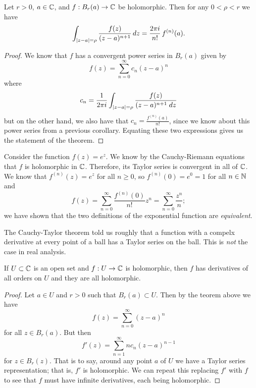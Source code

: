 
\begin{theorem}
    Let $r > 0$, $a \in \mathbb{C}$, and $f: B_r(a) \to \mathbb{C}$ be holomorphic.
    Then for any $0 < \rho < r$ we have
    \[
        \int_{\left\lvert z-a\right\rvert=\rho} \frac{f(z)}{(z-a)^{n+1}} \,dz
        = \frac{2\pi i}{n!} \, f^{(n)}(a).
    \]
\end{theorem}

\begin{proof}
    We know that $f$ has a convergent power series in $B_r(a)$ given by
    \[
        f(z) = \sum^{\infty}_{n=0} c_n(z-a)^n
    \]
    where
    \[
        c_n = \frac{1}{2\pi i} \int_{\left\lvert z-a\right\rvert=\rho} \frac{f(z)}{(z-a)^{n+1} \;dz} 
    \]
    but on the other hand, we also have that $c_n = \frac{f^{(n)}(a)}{n!}$,
    since we know about this power series from a previous corollary.
    Equating these two expressions gives us the statement of the theorem.
\end{proof}

\begin{example}
    Consider the function $f(z) = e^z$.
    We know by the Cauchy-Riemann equations that $f$ is holomorphic in $\mathbb{C}$.
    Therefore, its Taylor series is convergent in all of $\mathbb{C}$.
    We know that $f^{(n)}(z) = e^z$ for all $n \geq 0$,
    so $f^{(n)}(0) = e^0 = 1$ for all $n \in \mathbb{N}$ and
    \[
        f(z) = \sum^{\infty}_{n=0} \frac{f^{(n)}(0)}{n!} z^n = \sum^{\infty}_{n=0} \frac{z^n}{n};
    \]
    we have shown that the two definitions of the exponential function
    are \emph{equivalent}.
\end{example}

\begin{remark}
    The Cauchy-Taylor theorem told us roughly that a function with a compelx derivative at
    every point of a ball has a Taylor series on the ball.
    This is \emph{not} the case in real analysis.
\end{remark}

\begin{corollary}
    If $U \subset \mathbb{C}$ is an open set and $f: U \to \mathbb{C}$ is holomorphic,
    then $f$ has derivatives of all orders on $U$ and they are all holomorphic.
\end{corollary}

\begin{proof}
    Let $a \in U$ and $r > 0$ such that $B_r(a) \subset U$.
    Then by the teorem above we have
    \[
        f(z) = \sum^{\infty}_{n=0} (z-a)^n
    \]
    for all $z \in B_r(a)$.
    But then
    \[
        f'(z) = \sum^{\infty}_{n=1} n c_n (z-a)^{n-1}
    \]
    for $z \in B_r(z)$.
    That is to say, around any point $a$ of $U$ we have a Taylor series representation;
    that is, $f'$ is holomorphic.
    We can repeat this replacing $f'$ with $f$ to see that $f$ must have infinite derivatives,
    each being holomorphic.
\end{proof}

